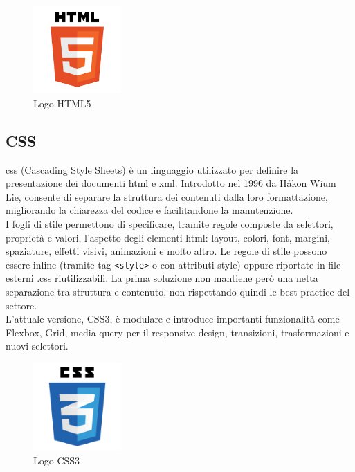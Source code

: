 \begin{figure}[H]
    \centering
    \includegraphics[width=0.3\textwidth]{img/html5.png}
    \caption[Logo HTML5]{Logo HTML5}
\end{figure}

\subsection{CSS}
\noindent \acrshort{css} (Cascading Style Sheets) è un linguaggio utilizzato per definire la presentazione dei documenti \acrshort{html} e \acrshort{xml}. Introdotto nel 1996 da Håkon Wium Lie, consente di separare la struttura dei contenuti dalla loro formattazione, migliorando la chiarezza del codice e facilitandone la manutenzione.\\ 
I fogli di stile permettono di specificare, tramite regole composte da selettori, proprietà e valori, l’aspetto degli elementi \acrshort{html}: layout, colori, font, margini, spaziature, effetti visivi, animazioni e molto altro. Le regole di stile possono essere inline (tramite tag \texttt{<style>} o con attributi style) oppure riportate in file esterni .css riutilizzabili. La prima soluzione non mantiene però una netta separazione tra struttura e contenuto, non rispettando quindi le best-practice del settore.\\ 
L'attuale versione, CSS3, è modulare e introduce importanti funzionalità come Flexbox, Grid, media query per il responsive design, transizioni, trasformazioni e nuovi selettori.
\begin{figure}[H]
    \centering
    \includegraphics[width=0.3\textwidth]{img/css3.png}
    \caption[Logo CSS3]{Logo CSS3}
\end{figure}


